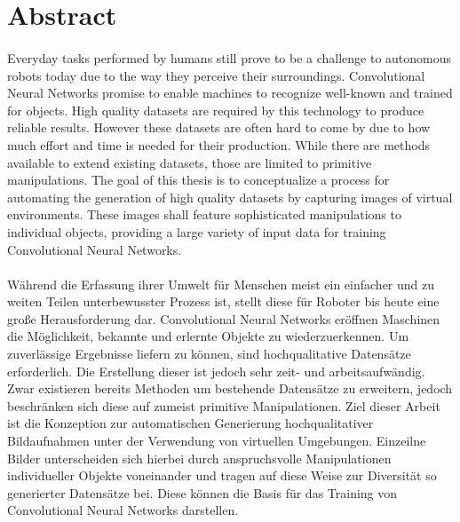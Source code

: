 \chapter*{Abstract}
\subsubsection*{\hsmatitelen}
Everyday tasks performed by humans still prove to be a challenge to autonomous robots today due to the way they perceive their surroundings. Convolutional Neural Networks promise to enable machines to recognize well-known and trained for objects. High quality datasets are required by this technology to produce reliable results. However these datasets are often hard to come by due to how much effort and time is needed for their production. While there are methods available to extend existing datasets, those are limited to primitive manipulations. The goal of this thesis is to conceptualize a process for automating the generation of high quality datasets by capturing images of virtual environments. These images shall feature sophisticated manipulations to individual objects, providing a large variety of input data for training Convolutional Neural Networks.

\subsubsection*{\hsmatitelde}
Während die Erfassung ihrer Umwelt für Menschen meist ein einfacher und zu weiten Teilen unterbewusster Prozess ist, stellt diese für Roboter bis heute eine große Herausforderung dar. Convolutional Neural Networks eröffnen Maschinen die Möglichkeit, bekannte und erlernte Objekte zu wiederzuerkennen. Um zuverlässige Ergebnisse liefern zu können, sind hochqualitative Datensätze erforderlich. Die Erstellung dieser ist jedoch sehr zeit- und arbeitsaufwändig. Zwar existieren bereits Methoden um bestehende Datensätze zu erweitern, jedoch beschränken sich diese auf zumeist primitive Manipulationen. Ziel dieser Arbeit ist die Konzeption zur automatischen Generierung hochqualitativer Bildaufnahmen unter der Verwendung von virtuellen Umgebungen. Einzeilne Bilder unterscheiden sich hierbei durch anspruchsvolle Manipulationen individueller Objekte voneinander und tragen auf diese Weise zur Diversität so generierter Datensätze bei. Diese können die Basis für das Training von Convolutional Neural Networks darstellen.